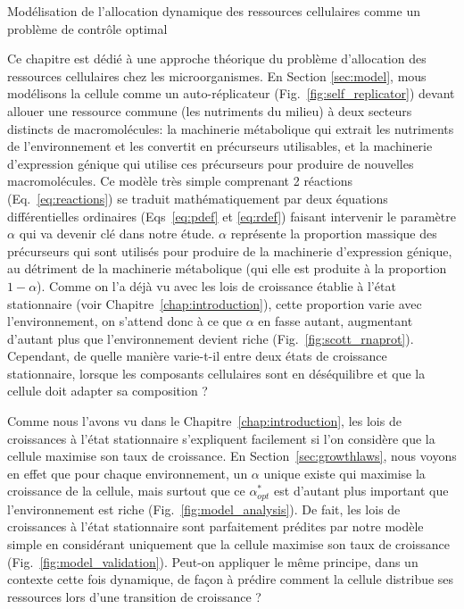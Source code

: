 \begin{chapter_summary}{Modélisation de l'allocation dynamique des ressources cellulaires comme un problème de contrôle optimal}

Ce chapitre est dédié à une approche théorique du problème d'allocation des ressources cellulaires chez les microorganismes.
En Section \ref{sec:model}, mous modélisons la cellule comme un auto-réplicateur (Fig.~\ref{fig:self_replicator}) devant allouer une ressource commune (les nutriments du milieu) à deux secteurs distincts de macromolécules: la machinerie métabolique qui extrait les nutriments de l'environnement et les convertit en précurseurs utilisables, et la machinerie d'expression génique qui utilise ces précurseurs pour produire de nouvelles macromolécules.
Ce modèle très simple comprenant 2 réactions (Eq.~\ref{eq:reactions}) se traduit mathématiquement par deux équations différentielles ordinaires (Eqs~\ref{eq:pdef} et \ref{eq:rdef}) faisant intervenir le paramètre $\alpha$ qui va devenir clé dans notre étude.
$\alpha$ représente la proportion massique des précurseurs qui sont utilisés pour produire de la machinerie d'expression génique, au détriment de la machinerie métabolique (qui elle est produite à la proportion $1-\alpha$).
Comme on l'a déjà vu avec les lois de croissance établie à l'état stationnaire (voir Chapitre~\ref{chap:introduction}), cette proportion varie avec l'environnement, on s'attend donc à ce que $\alpha$ en fasse autant, augmentant d'autant plus que l'environnement devient riche (Fig.~\ref{fig:scott_rnaprot}).
Cependant, de quelle manière varie-t-il entre deux états de croissance stationnaire, lorsque les composants cellulaires sont en déséquilibre et que la cellule doit adapter sa composition ?

Comme nous l'avons vu dans le Chapitre~\ref{chap:introduction}, les lois de croissances à l'état stationnaire s'expliquent facilement si l'on considère que la cellule maximise son taux de croissance.
En Section~\ref{sec:growthlaws}, nous voyons en effet que pour chaque environnement, un $\alpha$ unique existe qui maximise la croissance de la cellule, mais surtout que ce $\alpha^*_{opt}$ est d'autant plus important que l'environnement est riche (Fig.~\ref{fig:model_analysis}).
De fait, les lois de croissances à l'état stationnaire sont parfaitement prédites par notre modèle simple en considérant uniquement que la cellule maximise son taux de croissance (Fig.~\ref{fig:model_validation}).
Peut-on appliquer le même principe, dans un contexte cette fois dynamique, de façon à prédire comment la cellule distribue ses ressources lors d'une transition de croissance ?


\end{chapter_summary}
